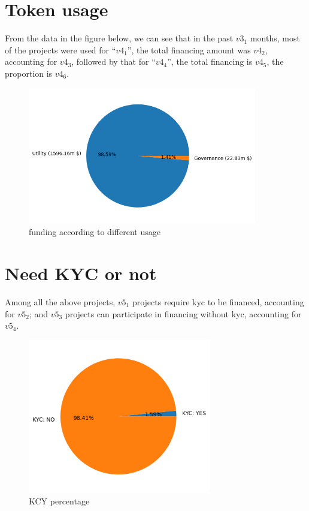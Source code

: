 \documentclass{TTP}
\begin{document}
\section{Token usage}
From the data in the figure below, we can see that in the past $v3_1$ months, most of the projects were used for ``$v4_1$'', the total financing amount was $v4_2$, accounting for $v4_3$, followed by that for ``$v4_4$'', the total financing is $v4_5$, the proportion is $v4_6$.
\begin{figure}[h]
  \centering
  \includegraphics[width=10cm]{usage_funding}
  \caption{funding according to different usage}
\end{figure}

\newpage

\section{Need KYC or not}
Among all the above projects, $v5_1$ projects require kyc to be financed, accounting for $v5_2$; and $v5_3$ projects can participate in financing without kyc, accounting for $v5_4$.
\begin{figure}[h]
  \centering
  \includegraphics[width=8cm]{whether_kyc}
  \caption{KCY percentage}
\end{figure}
\end{document}
